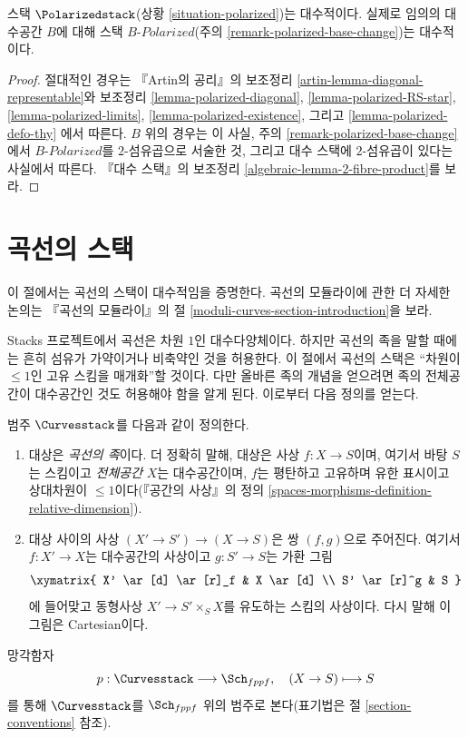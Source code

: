 \begin{theorem}
\label{theorem-polarized-algebraic}
스택 $\Polarizedstack$(상황 \ref{situation-polarized})는 대수적이다. 실제로
임의의 대수공간 $B$에 대해 스택 $B\textit{-Polarized}$(주의
\ref{remark-polarized-base-change})는 대수적이다.
\end{theorem}

\begin{proof}
절대적인 경우는 『Artin의 공리』의 보조정리
\ref{artin-lemma-diagonal-representable}와 보조정리
\ref{lemma-polarized-diagonal},
\ref{lemma-polarized-RS-star},
\ref{lemma-polarized-limits},
\ref{lemma-polarized-existence}, 그리고
\ref{lemma-polarized-defo-thy}
에서 따른다. $B$ 위의 경우는 이 사실, 주의
\ref{remark-polarized-base-change}에서 $B\textit{-Polarized}$를 $2$-섬유곱으로
서술한 것, 그리고 대수 스택에 $2$-섬유곱이 있다는 사실에서 따른다.
『대수 스택』의 보조정리 \ref{algebraic-lemma-2-fibre-product}를 보라.
\end{proof}











\section{곡선의 스택}
\label{section-curves}

\noindent
이 절에서는 곡선의 스택이 대수적임을 증명한다. 곡선의 모듈라이에 관한 더
자세한 논의는 『곡선의 모듈라이』의 절
\ref{moduli-curves-section-introduction}을 보라.

\medskip\noindent
Stacks 프로젝트에서 곡선은 차원 $1$인 대수다양체이다. 하지만 곡선의 족을
말할 때에는 흔히 섬유가 가약이거나 비축약인 것을 허용한다. 이 절에서 곡선의
스택은 ``차원이 $\leq 1$인 고유 스킴을 매개화''할 것이다. 다만 올바른 족의
개념을 얻으려면 족의 전체공간이 대수공간인 것도 허용해야 함을 알게 된다.
이로부터 다음 정의를 얻는다.

\begin{situation}
\label{situation-curves}
범주 $\Curvesstack$를 다음과 같이 정의한다.
\begin{enumerate}
\item 대상은 {\it 곡선의 족}이다. 더 정확히 말해, 대상은 사상
$f : X \to S$이며, 여기서 바탕 $S$는 스킴이고 {\it 전체공간} $X$는
대수공간이며, $f$는 평탄하고 고유하며 유한 표시이고 상대차원이
$\leq 1$이다(『공간의 사상』의 정의
\ref{spaces-morphisms-definition-relative-dimension}).
\item 대상 사이의 사상 $(X' \to S') \to (X \to S)$은 쌍 $(f, g)$으로
주어진다. 여기서 $f : X' \to X$는 대수공간의 사상이고 $g : S' \to S$는
가환 그림
$$
\xymatrix{
X' \ar[d] \ar[r]_f & X \ar[d] \\
S' \ar[r]^g & S
}
$$
에 들어맞고 동형사상 $X' \to S' \times_S X$를 유도하는 스킴의 사상이다.
다시 말해 이 그림은 Cartesian이다.
\end{enumerate}
망각함자
$$
p : \Curvesstack \longrightarrow \Sch_{fppf},\quad
(X \to S) \longmapsto S
$$
를 통해 $\Curvesstack$를 $\Sch_{fppf}$ 위의 범주로 본다(표기법은 절
\ref{section-conventions} 참조).
\end{situation}


